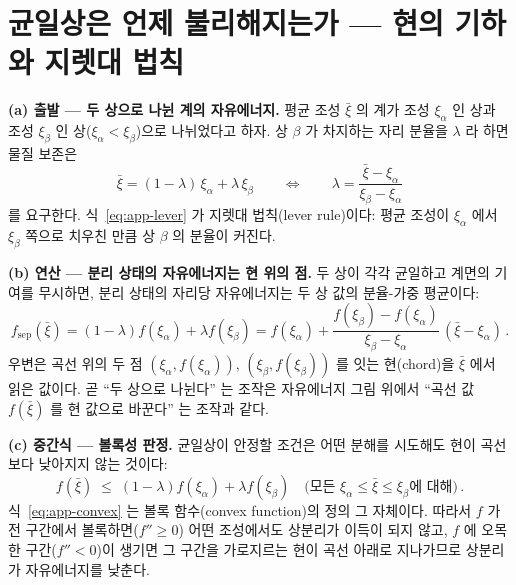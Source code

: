 \documentclass[11pt,a4paper]{article}
\begin{document}
\section{균일상은 언제 불리해지는가 --- 현의 기하와 지렛대 법칙}\label{app:chord}

\textbf{(a) 출발 --- 두 상으로 나뉜 계의 자유에너지.} 평균 조성 $\bar\xi$ 의 계가 조성 $\xi_\alpha$ 인
상과 조성 $\xi_\beta$ 인 상($\xi_\alpha<\xi_\beta$)으로 나뉘었다고 하자. 상 $\beta$ 가 차지하는 자리
분율을 $\lambda$ 라 하면 물질 보존은
\begin{equation}
\bar\xi=(1-\lambda)\,\xi_\alpha+\lambda\,\xi_\beta
\qquad\Longleftrightarrow\qquad
\lambda=\frac{\bar\xi-\xi_\alpha}{\xi_\beta-\xi_\alpha}
\label{eq:app-lever}
\end{equation}
를 요구한다. 식~\eqref{eq:app-lever} 가 지렛대 법칙(lever rule)이다: 평균 조성이 $\xi_\alpha$ 에서
$\xi_\beta$ 쪽으로 치우친 만큼 상 $\beta$ 의 분율이 커진다.

\textbf{(b) 연산 --- 분리 상태의 자유에너지는 현 위의 점.} 두 상이 각각 균일하고 계면의 기여를
무시하면, 분리 상태의 자리당 자유에너지는 두 상 값의 분율-가중 평균이다:
\begin{equation}
f_\mathrm{sep}(\bar\xi)=(1-\lambda)f(\xi_\alpha)+\lambda f(\xi_\beta)
=f(\xi_\alpha)+\frac{f(\xi_\beta)-f(\xi_\alpha)}{\xi_\beta-\xi_\alpha}\,(\bar\xi-\xi_\alpha)\,.
\label{eq:app-chord}
\end{equation}
우변은 곡선 위의 두 점 $(\xi_\alpha,f(\xi_\alpha))$, $(\xi_\beta,f(\xi_\beta))$ 를 잇는
현(chord)을 $\bar\xi$ 에서 읽은 값이다. 곧 ``두 상으로 나뉜다'' 는 조작은 자유에너지 그림 위에서
``곡선 값 $f(\bar\xi)$ 를 현 값으로 바꾼다'' 는 조작과 같다.

\textbf{(c) 중간식 --- 볼록성 판정.} 균일상이 안정할 조건은 어떤 분해를 시도해도 현이 곡선보다 낮아지지
않는 것이다:
\begin{equation}
f(\bar\xi)\;\le\;(1-\lambda)f(\xi_\alpha)+\lambda f(\xi_\beta)
\quad\text{(모든 }\xi_\alpha\le\bar\xi\le\xi_\beta\text{에 대해)}\,.
\label{eq:app-convex}
\end{equation}
식~\eqref{eq:app-convex} 는 볼록 함수(convex function)의 정의 그 자체이다. 따라서 $f$ 가 전 구간에서
볼록하면($f''\ge0$) 어떤 조성에서도 상분리가 이득이 되지 않고, $f$ 에 오목한 구간($f''<0$)이 생기면
그 구간을 가로지르는 현이 곡선 아래로 지나가므로 상분리가 자유에너지를 낮춘다.
\end{document}
